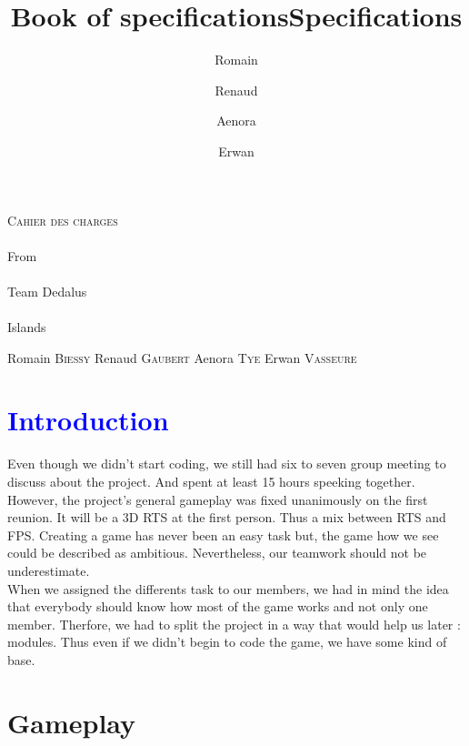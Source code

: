 \documentclass[article]{report} %
\title {Book of specifications}
\title {Specifications}
\author {Romain\and Renaud\and Aenora\and Erwan}
\date {}
\begin{document}
		\thispagestyle{empty}
  			\begin{titlepage} 
						\vspace*{5cm} 
  					\begin{center} 
  							{\huge{\textsc{Cahier des charges} \\ ~ \\{\large From}\\ ~\\ Team Dedalus \\ ~ \\ Islands}}
	  						\vspace*{10cm}
						\end{center}
  					\hfill {\large Romain \textsc{Biessy}}
  					\hfill {\large Renaud \textsc{Gaubert}}
  					\hfill {\large Aenora \textsc{Tye}}
  					\hfill {\large Erwan  \textsc{Vasseure}}
  			\end{titlepage} 

  	\tableofcontents
  			\newpage
				\chapter{\textcolor{blue}{Introduction}}%
								Even though we didn't start coding, we still had six to seven group meeting to discuss about the project. And spent at least 15 hours speeking together.\newline
								However, the project's general gameplay was fixed unanimously on the first reunion. It will be a 3D RTS at the first person. Thus a mix between RTS and FPS. Creating a game has never been an easy task but, the game how we see could be described as ambitious. Nevertheless, our teamwork should not be underestimate.\\
								
								When we assigned the differents task to our members, we had in mind the idea that everybody should know how most of the game works and not only one member. Therfore, we had to split the project in a way that would help us later : modules. Thus even if we didn't begin to code the game, we have some kind of base. 								
								
  			\chapter{Gameplay}
\end{document}
